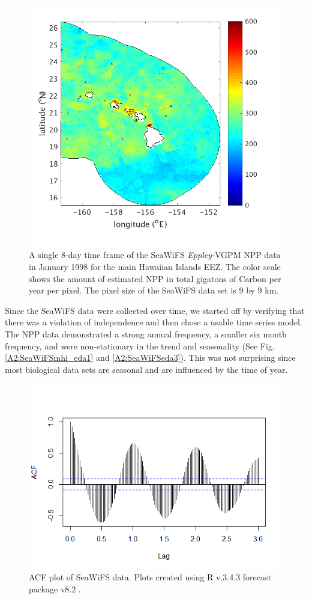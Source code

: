 \documentclass[oneside,12pt,final]{sty/ucthesis-CA2012}
\let\cite\citep                             %
\begin{document}
\begin{mainmatter}
\begin{figure}[H]
     \centering
       \includegraphics[width=.7\textwidth]{fig/SeaWiFSmhi}
    \caption{A single 8-day time frame of the SeaWiFS \textit{Eppley-}VGPM NPP data in January 1998 for the main Hawaiian Islands EEZ. The color scale shows the amount of estimated NPP in total gigatons of Carbon per year per pixel. The pixel size of the SeaWiFS data set is 9 by 9 km.}
    \label{A2:SeaWiFSmhi}
\end{figure}

Since the SeaWiFS data were collected over time, we started off by verifying that there was a violation of independence and then chose a usable time series model. The NPP data demonstrated a strong annual frequency, a smaller six month frequency, and were non-stationary in the trend and seasonality (See Fig. \ref{A2:SeaWiFSmhi_eda1}  and \ref{A2:SeaWiFSeda3}). This was not surprising since most biological data sets are seasonal and are influenced by the time of year. 

\begin{figure}[H]
     \centering
       \includegraphics[width=.7\textwidth]{fig/seawifs_acf}
    \caption{ACF plot of SeaWiFS data. Plots created using R v.3.4.3 \cite{Rcite} forecast package v8.2 \cite{forecast1, forecast2}.}
    \label{A2:SeaWiFSeda1}
\end{figure}


\end{mainmatter}
\end{document}
